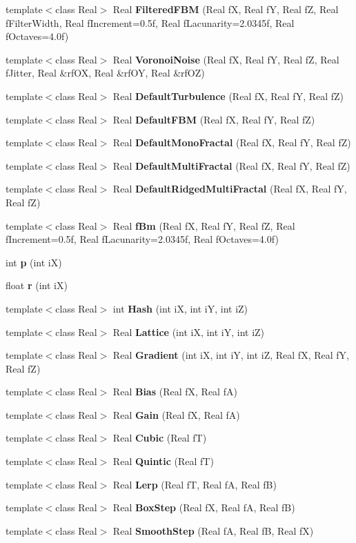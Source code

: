 \begin{CompactItemize}
template$<$class Real$>$ Real {\bf Filtered\-FBM} (Real f\-X, Real f\-Y, Real f\-Z, Real f\-Filter\-Width, Real f\-Increment=0.5f, Real f\-Lacunarity=2.0345f, Real f\-Octaves=4.0f)
\item 
template$<$class Real$>$ Real {\bf Voronoi\-Noise} (Real f\-X, Real f\-Y, Real f\-Z, Real f\-Jitter, Real \&rf\-OX, Real \&rf\-OY, Real \&rf\-OZ)
\item 
template$<$class Real$>$ Real {\bf Default\-Turbulence} (Real f\-X, Real f\-Y, Real f\-Z)
\item 
template$<$class Real$>$ Real {\bf Default\-FBM} (Real f\-X, Real f\-Y, Real f\-Z)
\item 
template$<$class Real$>$ Real {\bf Default\-Mono\-Fractal} (Real f\-X, Real f\-Y, Real f\-Z)
\item 
template$<$class Real$>$ Real {\bf Default\-Multi\-Fractal} (Real f\-X, Real f\-Y, Real f\-Z)
\item 
template$<$class Real$>$ Real {\bf Default\-Ridged\-Multi\-Fractal} (Real f\-X, Real f\-Y, Real f\-Z)
\item 
template$<$class Real$>$ Real {\bf f\-Bm} (Real f\-X, Real f\-Y, Real f\-Z, Real f\-Increment=0.5f, Real f\-Lacunarity=2.0345f, Real f\-Octaves=4.0f)
\item 
int {\bf p} (int i\-X)
\item 
float {\bf r} (int i\-X)
\item 
template$<$class Real$>$ int {\bf Hash} (int i\-X, int i\-Y, int i\-Z)
\item 
template$<$class Real$>$ Real {\bf Lattice} (int i\-X, int i\-Y, int i\-Z)
\item 
template$<$class Real$>$ Real {\bf Gradient} (int i\-X, int i\-Y, int i\-Z, Real f\-X, Real f\-Y, Real f\-Z)
\item 
template$<$class Real$>$ Real {\bf Bias} (Real f\-X, Real f\-A)
\item 
template$<$class Real$>$ Real {\bf Gain} (Real f\-X, Real f\-A)
\item 
template$<$class Real$>$ Real {\bf Cubic} (Real f\-T)
\item 
template$<$class Real$>$ Real {\bf Quintic} (Real f\-T)
\item 
template$<$class Real$>$ Real {\bf Lerp} (Real f\-T, Real f\-A, Real f\-B)
\item 
template$<$class Real$>$ Real {\bf Box\-Step} (Real f\-X, Real f\-A, Real f\-B)
\item 
template$<$class Real$>$ Real {\bf Smooth\-Step} (Real f\-A, Real f\-B, Real f\-X)

\end{CompactItemize}

